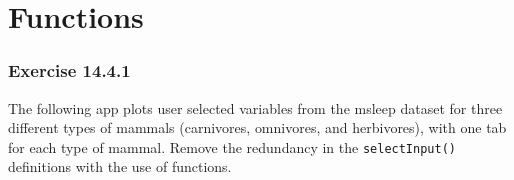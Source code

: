 \documentclass[
]{book}
\theoremstyle{definition}
\theoremstyle{definition}
\theoremstyle{definition}
\theoremstyle{definition}
\theoremstyle{remark}
\begin{document}
\hypertarget{functions}{%
\chapter{Functions}\label{functions}}

\hypertarget{exercise-14.4.1}{%
\subsection*{Exercise 14.4.1}\label{exercise-14.4.1}}

The following app plots user selected variables from the msleep dataset for three different types of mammals (carnivores, omnivores, and herbivores), with one tab for each type of mammal. Remove the redundancy in the \texttt{selectInput()} definitions with the use of functions.
\end{document}
